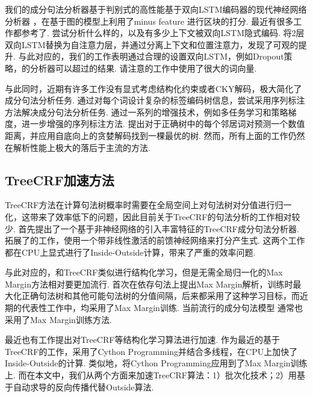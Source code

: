 我们的成分句法分析器基于判别式的高性能基于双向LSTM编码器的现代神经网络分析器 \citep{stern-etal-2017-minimal}，在基于图的模型上利用了minus feature \citep{cross-huang-2016-span}进行区块的打分.
最近有很多工作都参考了\citet{stern-etal-2017-minimal}.
\citet{gaddy-etal-2018-whats}尝试分析什么样的，以及有多少上下文被双向LSTM隐式编码.
\citet{kitaev-klein-2018-constituency}将2层双向LSTM替换为自注意力层，并通过分离上下文和位置注意力，发现了可观的提升.
与此对应的，我们的工作表明通过合理的设置双向LSTM，例如Dropout策略，\citet{stern-etal-2017-minimal}的分析器可以超过\citet{kitaev-klein-2018-constituency}的结果.
请注意\citet{kitaev-klein-2018-constituency}的工作中使用了很大的词向量.

与此同时，近期有许多工作没有显式考虑结构化约束或者CKY解码，极大简化了成分句法分析任务.
\citet{gomez-rodriguez-vilares-2018-constituent}通过对每个词设计复杂的标签编码树信息，尝试采用序列标注方法解决成分句法分析任务.
\citet{vilares-etal-2019-better}通过一系列的增强技术，例如多任务学习和策略梯度，进一步增强的序列标注方法.
\citet{shen-etal-2018-straight}提出对于正确树中的每个邻居词对预测一个数值距离，并应用自底向上的贪婪解码找到一棵最优的树.
然而，所有上面的工作仍然在解析性能上极大的落后于主流的方法.

\subsection{TreeCRF加速方法}

TreeCRF方法在计算句法树概率时需要在全局空间上对句法树对分值进行归一化，这带来了效率低下的问题，因此目前关于TreeCRF的句法分析的工作相对较少.
\citet{finkel-etal-2008-efficient}首先提出了一个基于非神经网络的引入丰富特征的TreeCRF成分句法分析器.
\citet{durrett-klein-2015-neural}拓展了\citet{finkel-etal-2008-efficient}的工作，使用一个带非线性激活的前馈神经网络来打分产生式.
这两个工作都在CPU上显式进行了Inside-Outside计算，带来了严重的效率问题.

与此对应的，和TreeCRF类似进行结构化学习，但是无需全局归一化的Max Margin方法相对要更加流行.
\citet{taskar-etal-2004-max}首次在依存句法上提出Max Margin解析，训练时最大化正确句法树和其他可能句法树的分值间隔，后来\citet{mcdonald-etal-2005-online,mcdonald-etal-2005-online}都采用了这种学习目标，而近期的代表性工作中，\citet{wang-chang-2016-graph,kiperwasser-goldberg-2016-simple}均采用了Max Margin训练.
当前流行的成分句法模型 \citep{stern-etal-2017-minimal,kitaev-klein-2018-constituency,zhou-zhao-2019-head}通常也采用了Max Margin训练方法.

最近也有工作提出对TreeCRF等结构化学习算法进行加速.
\citet{zhang-etal-2017-dependency-parsing,jiang-etal-2018-supervised,li-etal-2019-semi-supervised}作为最近的基于TreeCRF的工作，采用了Cython Programming并结合多线程，在CPU上加快了Inside-Outside的计算.
类似地，\citet{kitaev-klein-2018-constituency}将Cython Programming应用到了Max Margin训练上.
而在本文中，我们从两个方面来加速TreeCRF算法：1）批次化技术；2）用基于自动求导的反向传播代替Outside算法.

